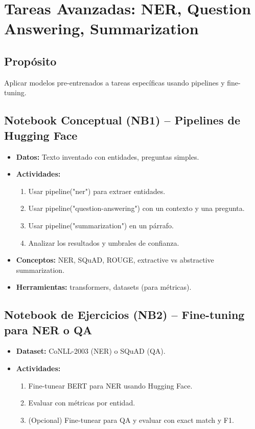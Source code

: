 \documentclass[12pt,a4paper]{article}
\begin{document}
\section{Tareas Avanzadas: NER, Question Answering, Summarization}
\subsection*{Propósito}
Aplicar modelos pre-entrenados a tareas específicas usando pipelines y fine-tuning.

\subsection*{Notebook Conceptual (NB1) – Pipelines de Hugging Face}
\begin{itemize}
    \item \textbf{Datos:} Texto inventado con entidades, preguntas simples.
    \item \textbf{Actividades:}
    \begin{enumerate}
        \item Usar pipeline("ner") para extraer entidades.
        \item Usar pipeline("question-answering") con un contexto y una pregunta.
        \item Usar pipeline("summarization") en un párrafo.
        \item Analizar los resultados y umbrales de confianza.
    \end{enumerate}
    \item \textbf{Conceptos:} NER, SQuAD, ROUGE, extractive vs abstractive summarization.
    \item \textbf{Herramientas:} transformers, datasets (para métricas).
\end{itemize}

\subsection*{Notebook de Ejercicios (NB2) – Fine-tuning para NER o QA}
\begin{itemize}
    \item \textbf{Dataset:} CoNLL-2003 (NER) o SQuAD (QA).
    \item \textbf{Actividades:}
    \begin{enumerate}
        \item Fine-tunear BERT para NER usando Hugging Face.
        \item Evaluar con métricas por entidad.
        \item (Opcional) Fine-tunear para QA y evaluar con exact match y F1.
    \end{enumerate}
\end{itemize}
\end{document}

